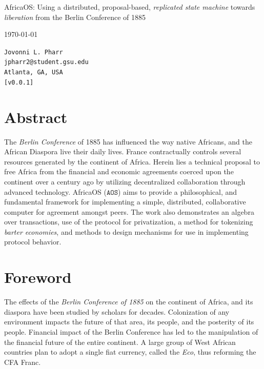 \documentclass[10pt, titlepage, twocolumn]{report}
\date{\today}
\date{}
\begin{document}
\begin{titlepage}

\protect\parbox{\textwidth}
	{\protect\centering 
		\huge AfricaOS:  Using a distributed, proposal-based, \textit{replicated state machine} towards \textit{liberation} from the Berlin Conference of 1885 
	} 
\begin{center}
{\LARGE
\today}
\end{center}


\vfill
{
\Large
\begin{center}
\texttt{Jovonni L. Pharr} \\
\texttt{jpharr2@student.gsu.edu} \\
\texttt{Atlanta, GA, USA} \\
\texttt{[v0.0.1]} \\
\end{center}
}

\setlength\parindent{24pt}


\vfill
\section*{Abstract}
\noindent

The \textit{Berlin Conference} of 1885 has influenced the way native Africans, and the African Diaspora live their daily lives. France contractually controls several resources generated by the continent of Africa. Herein lies a technical proposal to free Africa from the financial and economic agreements coerced upon the continent over a century ago by utilizing decentralized collaboration through advanced technology. AfricaOS (\(\texttt{AOS}\)) aims to provide a philosophical, and fundamental framework for implementing a simple, distributed, collaborative computer for agreement amongst peers. The work also demonstrates an algebra over transactions, use of the protocol for privatization, a method for tokenizing \textit{barter economies}, and methods to design mechanisms for use in implementing protocol behavior. 

\end{titlepage}


\tableofcontents
\listoffigures

\clearpage


\onecolumn
\section{Foreword}
\hspace*{24pt}
The effects of the \textit{Berlin Conference of 1885} on the continent of Africa, and its diaspora have been studied by scholars for decades. Colonization of any environment impacts the future of that area, its people, and the posterity of its people. Financial impact of the Berlin Conference has led to the manipulation of the financial future of the entire continent. A large group of West African countries plan to adopt a single fiat currency, called the \textit{Eco}, thus reforming the CFA Franc. 
\end{document}
